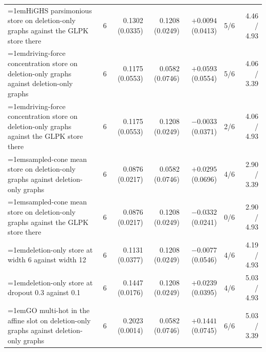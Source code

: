 \begin{table}[H]
\begin{tabular}{@{}>{\raggedright\hangindent=1em\hangafter=1\arraybackslash}p{78.5mm}rrrrrr@{}}
    HiGHS parsimonious store on deletion-only graphs against the GLPK store there & 6 & 0.1302 (0.0335) & 0.1208 (0.0249) & $+0.0094$ (0.0413) & 5/6 & 4.46 / 4.93 \\
    driving-force concentration store on deletion-only graphs against deletion-only graphs & 6 & 0.1175 (0.0553) & 0.0582 (0.0746) & $+0.0593$ (0.0554) & 5/6 & 4.06 / 3.39 \\
    driving-force concentration store on deletion-only graphs against the GLPK store there & 6 & 0.1175 (0.0553) & 0.1208 (0.0249) & $-0.0033$ (0.0371) & 2/6 & 4.06 / 4.93 \\
    sampled-cone mean store on deletion-only graphs against deletion-only graphs & 6 & 0.0876 (0.0217) & 0.0582 (0.0746) & $+0.0295$ (0.0696) & 4/6 & 2.90 / 3.39 \\
    sampled-cone mean store on deletion-only graphs against the GLPK store there & 6 & 0.0876 (0.0217) & 0.1208 (0.0249) & $-0.0332$ (0.0241) & 0/6 & 2.90 / 4.93 \\
    deletion-only store at width 6 against width 12 & 6 & 0.1131 (0.0377) & 0.1208 (0.0249) & $-0.0077$ (0.0546) & 4/6 & 4.19 / 4.93 \\
    deletion-only store at dropout 0.3 against 0.1 & 6 & 0.1447 (0.0176) & 0.1208 (0.0249) & $+0.0239$ (0.0395) & 4/6 & 5.03 / 4.93 \\
    GO multi-hot in the affine slot on deletion-only graphs against deletion-only graphs & 6 & 0.2023 (0.0014) & 0.0582 (0.0746) & $+0.1441$ (0.0745) & 6/6 & 5.03 / 3.39 \\
    \hline
  \end{tabular}
\end{table}

